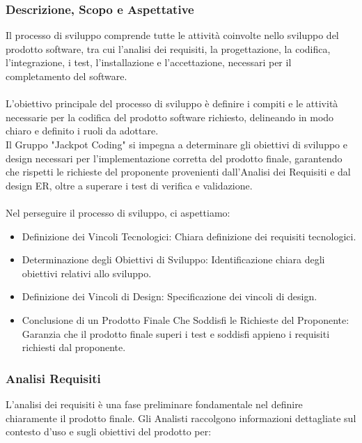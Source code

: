 \documentclass{article}
\begin{document}
\subsubsection{Descrizione, Scopo e Aspettative }
Il processo di sviluppo comprende tutte le attività coinvolte nello sviluppo del prodotto software, tra cui l'analisi dei requisiti, la progettazione, la codifica, l'integrazione, i test, l'installazione e l'accettazione, necessari per il completamento del software.\\\\
L'obiettivo principale del processo di sviluppo è definire i compiti e le attività necessarie per la codifica del prodotto software richiesto, delineando in modo chiaro e definito i ruoli da adottare.\\
Il Gruppo "Jackpot Coding" si impegna a determinare gli obiettivi di sviluppo e design necessari per l'implementazione corretta del prodotto finale, garantendo che rispetti le richieste del proponente provenienti dall'Analisi dei Requisiti e dal design ER, oltre a superare i test di verifica e validazione.\\\\
Nel perseguire il processo di sviluppo, ci aspettiamo:
\begin{itemize}
    \item Definizione dei Vincoli Tecnologici: Chiara definizione dei requisiti tecnologici.
    \item Determinazione degli Obiettivi di Sviluppo: Identificazione chiara degli obiettivi relativi allo sviluppo.
    \item Definizione dei Vincoli di Design: Specificazione dei vincoli di design.
    \item Conclusione di un Prodotto Finale Che Soddisfi le Richieste del Proponente: Garanzia che il prodotto finale superi i test e soddisfi appieno i requisiti richiesti dal proponente.
\end{itemize}

\subsubsection{Analisi Requisiti}
L'analisi dei requisiti è una fase preliminare fondamentale nel definire chiaramente il prodotto finale. Gli Analisti raccolgono informazioni dettagliate sul contesto d'uso e sugli obiettivi del prodotto per:
\end{document}
